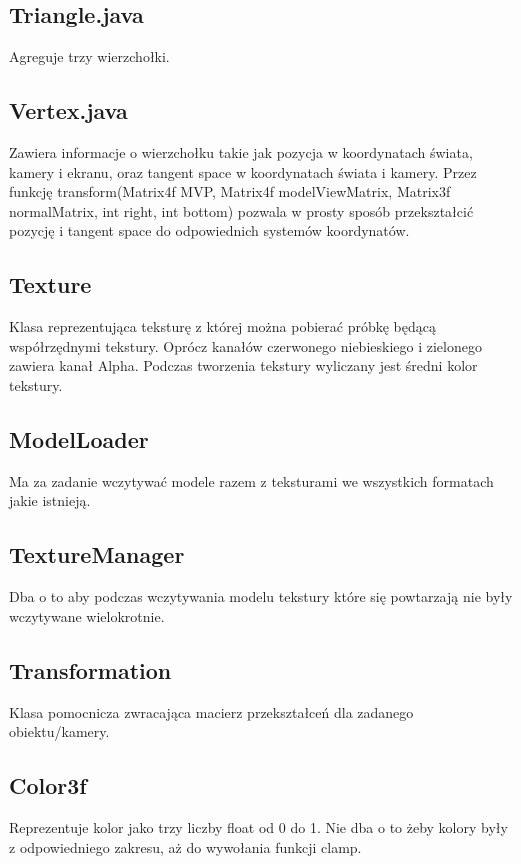 \documentclass[onecolumn]{article}
\begin{document}
\subsection{Triangle.java}
Agreguje trzy wierzchołki.

\subsection{Vertex.java}
Zawiera informacje o wierzchołku takie jak pozycja w koordynatach świata, kamery i ekranu, oraz tangent space w koordynatach świata i kamery. Przez funkcję transform(Matrix4f MVP, Matrix4f modelViewMatrix, Matrix3f normalMatrix, int right, int bottom) pozwala w prosty sposób przekształcić pozycję i tangent space do odpowiednich systemów koordynatów.

\subsection{Texture}
Klasa reprezentująca teksturę z której można pobierać próbkę będącą współrzędnymi tekstury. Oprócz kanałów czerwonego niebieskiego i zielonego zawiera kanał Alpha. Podczas tworzenia tekstury wyliczany jest średni kolor tekstury.

\subsection{ModelLoader}
Ma za zadanie wczytywać modele razem z teksturami we wszystkich formatach jakie istnieją.

\subsection{TextureManager}
Dba o to aby podczas wczytywania modelu tekstury które się powtarzają nie były wczytywane wielokrotnie.

\subsection{Transformation}
Klasa pomocnicza zwracająca macierz przekształceń dla zadanego obiektu/kamery.

\subsection{Color3f}
Reprezentuje kolor jako trzy liczby float od 0 do 1. Nie dba o to żeby kolory były z odpowiedniego zakresu, aż do wywołania funkcji clamp.
\end{document}
